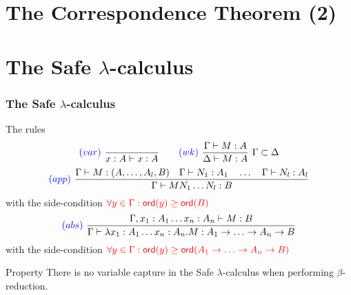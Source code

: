 
\section{The Correspondence Theorem (2)}

\section{The Safe \texorpdfstring{$\lambda$}{lambda}-calculus}
\begin{frame} \frametitle{The Safe $\lambda$-calculus}
\begin{block}{The rules}
$$ \textcolor{blue}{(var)} \   \frac{\displaystyle }{x : A\vdash x : A}
\qquad  \textcolor{blue}{(wk)} \   \frac{\displaystyle \Gamma \vdash M : A}{\Delta \vdash
M : A} \ \Gamma \subset \Delta$$
$$ \textcolor{blue}{(app)} \  \frac{\displaystyle \Gamma \vdash M : (A,\ldots,A_l,B)
                                        \quad \Gamma \vdash N_1 : A_1
                                        \quad \ldots \quad \Gamma \vdash N_l : A_l  }{\Gamma  \vdash M N_1 \ldots N_l : B}$$
\hfill with the side-condition $\textcolor{red}{\forall y \in \Gamma
: {\sf ord}(y) \geq {\sf ord}(B)}$
$$ \textcolor{blue}{(abs)} \   \frac{\displaystyle \Gamma, x_1:A_1 \ldots x_n : A_n \vdash M : B}{\Gamma  \vdash \lambda x_1:A_1 \ldots x_n : A_n . M : A_1 \rightarrow \ldots \rightarrow A_n \rightarrow B}$$
\hfill with the side-condition $\textcolor{red}{\forall y \in \Gamma
: {\sf ord}(y) \geq {\sf ord}(A_1 \rightarrow \ldots \rightarrow A_n
\rightarrow B)}$
\end{block}

\begin{block}{Property}
There is no variable capture in the Safe $\lambda$-calculus when
performing $\beta$-reduction.
\end{block}
\end{frame}


